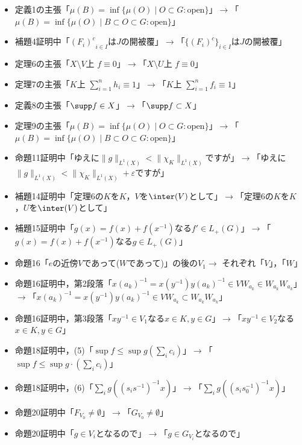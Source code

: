 \begin{itemize}
\item 定義1の主張「$\mu(B)=\inf \{ \mu(O) \mid O \subset G : \mathrm{open} \}$」$\rightarrow$「$\mu(B)=\inf \{ \mu(O) \mid B \subset O \subset G : \mathrm{open} \}$」
\item 補題4証明中「${(F_i)^{c}}_{i \in I}$は$J$の開被覆」$\rightarrow$「$\{ (F_i)^{c} \}_{i \in I}$は$J$の開被覆」
\item 定理6の主張「$X \setminus V$上 $f \equiv 0$」$\rightarrow$「$X \setminus U$上 $f \equiv 0$」
\item 定理7の主張「$K$上 $\sum_{i=1}^{n}h_i \equiv 1$」$\rightarrow$「$K$上 $\sum_{i=1}^{n}f_i \equiv 1$」
\item 定義8の主張「$\supp f \in X$」$\rightarrow$「$\supp f \subset X$」
\item 定理9の主張「$\mu(B)=\inf \{ \mu(O) \mid O \subset G : \mathrm{open} \}$」$\rightarrow$「$\mu(B)=\inf \{ \mu(O) \mid B \subset O \subset G : \mathrm{open} \}$」
\item 命題11証明中「ゆえに$\| g\|  _{L^1(X)} < \| \chi_{K} \| _{L^1(X)} $ですが」$\rightarrow$「ゆえに$\| g\|  _{L^1(X)} < \| \chi_{K} \| _{L^1(X)} +\varepsilon $ですが」
\item 補題14証明中「定理6の$K$を$K$，$V$を$\inter(V)$として」$\rightarrow$「定理6の$K$を$K$，$U$を$\inter(V)$として」
\item 補題15証明中「$g(x)=f(x)+f(x^{-1})$なる$f' \in L_{+}(G)$」$\rightarrow$「$g(x)=f(x)+f(x^{-1})$なる$g \in L_{+}(G)$」
\item 命題16「$e$の近傍$V$であって($W$であって)」の後の$V_1 \rightarrow$ それぞれ「$V$」，「$W$」
\item 命題16証明中，第2段落「$x(a_k)^{-1}=x(y^{-1})y(a_k)^{-1} \in VW_{a_k} \in W_{a_k}W_{a_k}$」$\rightarrow$「$x(a_k)^{-1}=x(y^{-1})y(a_k)^{-1} \in VW_{a_k} \subset W_{a_k}W_{a_k}$」
\item 命題16証明中，第3段落「$xy^{-1} \in V_1$なる$x \in K, y \in G$」$\rightarrow$「$xy^{-1} \in V_2$なる$x \in K, y \in G$」
\item 命題18証明中，(5)「$\sup f \le \sup g ( \sum_{i}c_{i} )$」$\rightarrow$「$\sup f \le \sup g \cdot ( \sum_{i}c_{i} )$」
\item 命題18証明中，(6)「$\sum_{i} g( (s_{i} s^{-1}) ^{-1}x)$」$\rightarrow$「$\sum_{i} g( (s_{i} s_{0}^{-1}) ^{-1}x)$」
\item 命題20証明中「$F_{V_0} \neq \emptyset$」$\rightarrow$「$G_{V_0} \neq \emptyset$」
\item 命題20証明中「$g \in V_i$となるので」$\rightarrow$「$g \in G_{V_i}$となるので」

\end{itemize}
